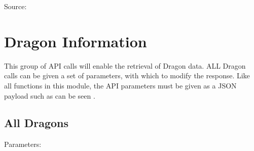\documentclass[letterpaper,10pt,english]{sphinxmanual}
\begin{document}

\noindent{}

Source:  


\chapter{Dragon Information}
\label{\detokenize{details/dragons:dragon-information}}\label{\detokenize{details/dragons::doc}}
This group of API calls will enable the retrieval of Dragon data. ALL Dragon calls can be given a set of parameters, with which to modify the response.
Like all functions in this module, the API parameters must be given as a JSON payload such as can be seen .


\section{All Dragons}
\label{\detokenize{details/dragons:all-dragons}}
\begin{sphinxVerbatim}[commandchars=\\\{\}]
  
\end{sphinxVerbatim}

Parameters:
\end{document}
